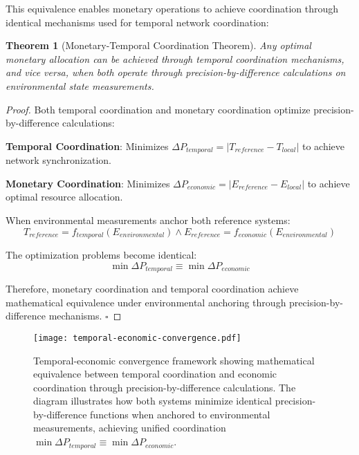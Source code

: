 \documentclass[12pt,a4paper]{article}
\newtheorem{theorem}{Theorem}
\begin{document}
This equivalence enables monetary operations to achieve coordination through identical mechanisms used for temporal network coordination:

\begin{theorem}[Monetary-Temporal Coordination Theorem]
Any optimal monetary allocation can be achieved through temporal coordination mechanisms, and vice versa, when both operate through precision-by-difference calculations on environmental state measurements.
\end{theorem}

\begin{proof}
Both temporal coordination and monetary coordination optimize precision-by-difference calculations:

\textbf{Temporal Coordination}: Minimizes $\Delta P_{temporal} = |T_{reference} - T_{local}|$ to achieve network synchronization.

\textbf{Monetary Coordination}: Minimizes $\Delta P_{economic} = |E_{reference} - E_{local}|$ to achieve optimal resource allocation.

When environmental measurements anchor both reference systems:
\begin{equation}
T_{reference} = f_{temporal}(E_{environmental}) \land E_{reference} = f_{economic}(E_{environmental})
\end{equation}

The optimization problems become identical:
\begin{equation}
\min \Delta P_{temporal} \equiv \min \Delta P_{economic}
\end{equation}

Therefore, monetary coordination and temporal coordination achieve mathematical equivalence under environmental anchoring through precision-by-difference mechanisms. $\square$
\end{proof}

\begin{figure}[H]
\centering
\texttt{[image: temporal-economic-convergence.pdf]}
\caption{Temporal-economic convergence framework showing mathematical equivalence between temporal coordination and economic coordination through precision-by-difference calculations. The diagram illustrates how both systems minimize identical precision-by-difference functions when anchored to environmental measurements, achieving unified coordination $\min \Delta P_{temporal} \equiv \min \Delta P_{economic}$.}
\label{fig:temporal_economic_convergence}
\end{figure}
\end{document}

